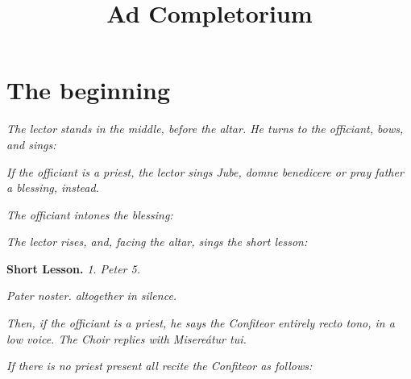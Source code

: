 \documentclass[a5paper,12pt,twoside,openany]{memoir}
\title{Ad Completorium}
\let\oldtextbf\textbf
\newcommand\rubrics[1]{\textit{#1}}
\newcommand\bibleref[2]{\oldtextbf{#1} \hfill \textit{#2}}
\begin{document}
\renewcommand\textbf[1]{%
    \pdfliteral direct {2 Tr 0.2 w}%
     \oldtextbf{#1}%
    \pdfliteral direct {0 Tr 0 w}%
}
\newcommand\embolden[1]{%
    \pdfliteral direct {2 Tr 0.2 w}%
     #1%
    \pdfliteral direct {0 Tr 0 w}%
}
\renewcommand\greboldfont[1]{%
    \pdfliteral direct {2 Tr 0.2 w}%
    \oldtextbf{#1}%
    \pdfliteral direct {0 Tr 0 w}%
}

\maketitle

\tableofcontents

\chapter{The beginning}

\rubrics{The lector stands in the middle, before the altar.  He turns to the officiant, bows, and sings:}


\rubrics{If the officiant is a priest, the lector sings \emph{Jube, domne benedicere} or pray father a blessing, instead.}

\rubrics{The officiant intones the blessing:}


\rubrics{The lector rises, and, facing the altar, sings the short lesson:}

\bibleref{Short Lesson.}{1. Peter 5.}




\rubrics{\emph{Pater noster.} altogether in silence.}

\rubrics{Then, if the officiant is a priest, he says the \emph{Confiteor} entirely recto tono, in a low voice.  The Choir replies with \emph{Misereátur tui.}}

\rubrics{If there is no priest present all recite the \emph{Confiteor} as follows:}
\end{document}
